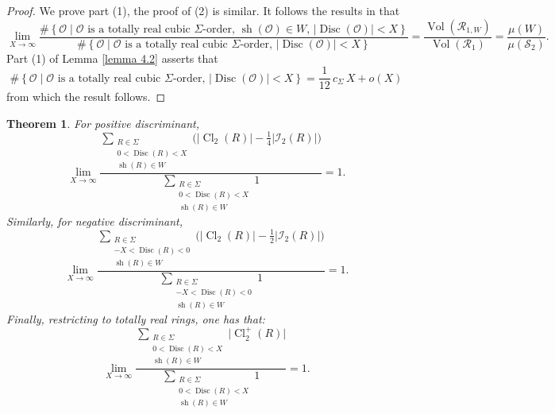 \documentclass[table]{amsart}
\newtheorem{theorem}{Theorem}[section]
\newcommand{\cO}{\mathcal{O}}
\newcommand{\op}[1]{\operatorname{#1}}
\numberwithin{equation}{section}
\begin{document}
\begin{proof}
    We prove part (1), the proof of (2) is similar. It follows the results in \cite[section 5]{bhargavaharron} that 
    \[\lim_{X\rightarrow \infty} \frac{\# \left\{\cO\mid \cO\text{ is a totally real cubic }\Sigma\text{-order, }\op{sh}(\cO)\in W\text{, } |\op{Disc}(\cO)|<X\right\}}{\# \left\{\cO\mid \cO\text{ is a totally real cubic }\Sigma\text{-order, } |\op{Disc}(\cO)|<X\right\}}=\frac{\op{Vol}(\mathcal{R}_{1,W})}{\op{Vol}(\mathcal{R}_{1})}=\frac{\mu(W)}{\mu(\mathcal{S}_2)}.\]
    Part (1) of Lemma \ref{lemma 4.2} asserts that 
    \[\# \left\{\cO\mid \cO\text{ is a totally real cubic }\Sigma\text{-order, } |\op{Disc}(\cO)|<X\right\}=\frac{1}{12}\,c_\Sigma\,X + o(X)\] from which the result follows.
\end{proof}

\begin{theorem}\label{main thm of article}
    For positive discriminant,
\begin{equation}
\label{eq:avg-positive}
\lim_{X\rightarrow \infty} \frac{
\sum_{\substack{R\in\Sigma \\ 0<\op{Disc}(R)<X\\
\op{sh}(R)\in W}}
\bigl(\lvert\op{Cl}_2(R)\rvert - \tfrac14 \lvert\mathcal{I}_2(R)\rvert\bigr)
}{
\sum_{\substack{R\in\Sigma \\ 0<\op{Disc}(R)<X\\
\op{sh}(R)\in W}} 1
}
=1.
\end{equation}
Similarly, for negative discriminant,
\begin{equation}
\label{eq:avg-negative}
\lim_{X\rightarrow \infty} \frac{
\sum_{\substack{R\in\Sigma \\ -X<\op{Disc}(R)<0 \\ \op{sh}(R)\in W}}
\bigl(\lvert\op{Cl}_2(R)\rvert - \tfrac12 \lvert\mathcal{I}_2(R)\rvert\bigr)
}{
\sum_{\substack{R\in\Sigma \\ -X<\op{Disc}(R)<0 \\ \op{sh}(R)\in W}} 1
}
=1.
\end{equation}
\noindent Finally, restricting to totally real rings, one has that:
\begin{equation}
\label{eq:avg-totally-real}
\lim_{X\rightarrow \infty} \frac{
\sum_{\substack{R\in\Sigma \\ 0<\op{Disc}(R)<X\\\op{sh}(R)\in W}}
\lvert\op{Cl}_2^{+}(R)\rvert
}{
\sum_{\substack{R\in\Sigma \\ 0<\op{Disc}(R)<X \\ \op{sh}(R)\in W}} 1
}
=1.
\end{equation}
\end{theorem}
\end{document}
